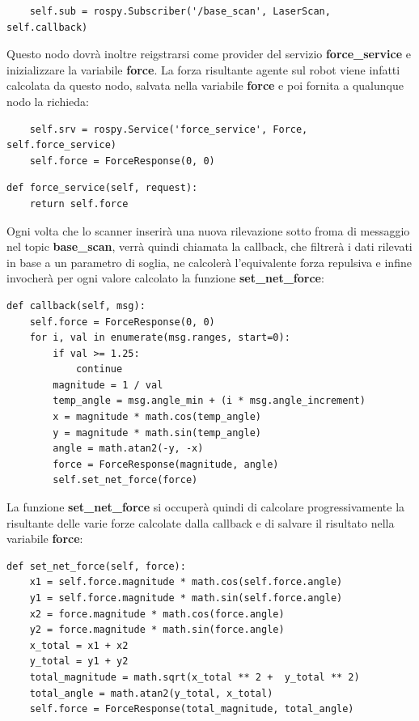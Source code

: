 \documentclass[Lau, binding=0.6cm, oneside]{sapthesis}
\begin{document}
\begin{lstlisting}
	self.sub = rospy.Subscriber('/base_scan', LaserScan, self.callback)
\end{lstlisting}

Questo nodo dovrà inoltre reigstrarsi come provider del servizio \textbf{force\_service} e inizializzare la variabile \textbf{force}.
La forza risultante agente sul robot viene infatti calcolata da questo nodo, salvata nella variabile \textbf{force} e poi fornita a qualunque nodo la richieda:

\begin{lstlisting}
    self.srv = rospy.Service('force_service', Force, self.force_service)
    self.force = ForceResponse(0, 0)
\end{lstlisting}

\begin{lstlisting}
def force_service(self, request):
    return self.force
\end{lstlisting}

Ogni volta che lo scanner inserirà una nuova rilevazione sotto froma di messaggio nel topic \textbf{base\_scan}, verrà quindi chiamata la callback, che filtrerà i dati rilevati in base a un parametro di soglia, ne calcolerà l'equivalente forza repulsiva e infine invocherà per ogni valore calcolato la funzione \textbf{set\_net\_force}:

\begin{lstlisting}
def callback(self, msg):
    self.force = ForceResponse(0, 0)
    for i, val in enumerate(msg.ranges, start=0):
        if val >= 1.25:
            continue
        magnitude = 1 / val
        temp_angle = msg.angle_min + (i * msg.angle_increment)
        x = magnitude * math.cos(temp_angle)
        y = magnitude * math.sin(temp_angle)
        angle = math.atan2(-y, -x)
        force = ForceResponse(magnitude, angle)
        self.set_net_force(force)
\end{lstlisting}

La funzione \textbf{set\_net\_force} si occuperà quindi di calcolare progressivamente la risultante delle varie forze calcolate dalla callback e di salvare il risultato nella variabile \textbf{force}:

\begin{lstlisting}
def set_net_force(self, force):
    x1 = self.force.magnitude * math.cos(self.force.angle)
    y1 = self.force.magnitude * math.sin(self.force.angle)
    x2 = force.magnitude * math.cos(force.angle)
    y2 = force.magnitude * math.sin(force.angle)
    x_total = x1 + x2
    y_total = y1 + y2
    total_magnitude = math.sqrt(x_total ** 2 +  y_total ** 2)
    total_angle = math.atan2(y_total, x_total)
    self.force = ForceResponse(total_magnitude, total_angle)
\end{lstlisting}
\end{document}
